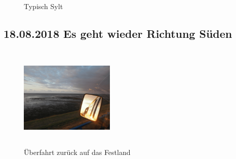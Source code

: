 \begin{figure}[H]
   \centering
   \quad
   \quad
   \quad
   \caption[Typisch Sylt]{Typisch Sylt}
\end{figure}
\newpage

\subsection{18.08.2018 Es geht wieder Richtung Süden}

\begin{figure} 
  \begin{centering}
    \includegraphics[width=0.4\textwidth, height=5cm, keepaspectratio]{../Bilder/Sylt/43.png}
    \caption{Überfahrt zurück auf das Festland}
  \end{centering}
\end{figure} 

